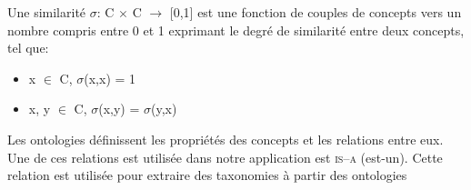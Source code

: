 


\begin{mydef}
  Une similarité $\sigma$: C $\times$ C $\rightarrow$ [0,1] est une
  fonction de couples de concepts vers un nombre compris entre 0 et 1
  exprimant le degré de similarité entre deux concepts, tel que:
  \SpecialItem
  \begin{itemize}
  \item x $\in$ C, $\sigma$(x,x) = 1
  \item x, y $\in$ C, $\sigma$(x,y) = $\sigma$(y,x)
  \end{itemize}
\end{mydef}

Les ontologies définissent les propriétés des concepts et les
relations entre eux. Une de ces relations est utilisée dans notre
application est \textsc{is–a} (est-un). Cette relation est utilisée
pour extraire des taxonomies à partir des ontologies

